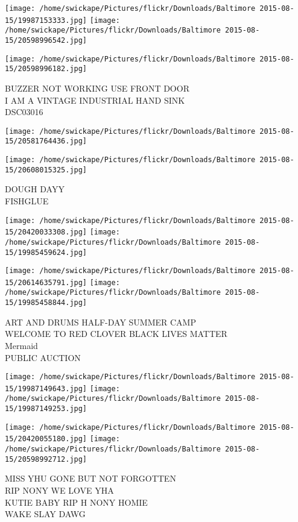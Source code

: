 \documentclass[10pt,letterpaper]{article}
\begin{document}
\texttt{[image: /home/swickape/Pictures/flickr/Downloads/Baltimore 2015-08-15/19987153333.jpg]}
\texttt{[image: /home/swickape/Pictures/flickr/Downloads/Baltimore 2015-08-15/20598996542.jpg]}

\texttt{[image: /home/swickape/Pictures/flickr/Downloads/Baltimore 2015-08-15/20598996182.jpg]}

BUZZER NOT WORKING USE FRONT DOOR\\
I AM A VINTAGE INDUSTRIAL HAND SINK\\
DSC03016\\
\pagebreak

\texttt{[image: /home/swickape/Pictures/flickr/Downloads/Baltimore 2015-08-15/20581764436.jpg]}

\vspace{0.25in}
\texttt{[image: /home/swickape/Pictures/flickr/Downloads/Baltimore 2015-08-15/20608015325.jpg]}

DOUGH DAYY\\
FISHGLUE\\
\pagebreak

\texttt{[image: /home/swickape/Pictures/flickr/Downloads/Baltimore 2015-08-15/20420033308.jpg]}
\texttt{[image: /home/swickape/Pictures/flickr/Downloads/Baltimore 2015-08-15/19985459624.jpg]}

\texttt{[image: /home/swickape/Pictures/flickr/Downloads/Baltimore 2015-08-15/20614635791.jpg]}
\texttt{[image: /home/swickape/Pictures/flickr/Downloads/Baltimore 2015-08-15/19985458844.jpg]}

ART AND DRUMS HALF{-}DAY SUMMER CAMP\\
WELCOME TO RED CLOVER BLACK LIVES MATTER\\
Mermaid\\
PUBLIC AUCTION\\
\pagebreak

\texttt{[image: /home/swickape/Pictures/flickr/Downloads/Baltimore 2015-08-15/19987149643.jpg]}
\texttt{[image: /home/swickape/Pictures/flickr/Downloads/Baltimore 2015-08-15/19987149253.jpg]}

\texttt{[image: /home/swickape/Pictures/flickr/Downloads/Baltimore 2015-08-15/20420055180.jpg]}
\texttt{[image: /home/swickape/Pictures/flickr/Downloads/Baltimore 2015-08-15/20598992712.jpg]}

MISS YHU GONE BUT NOT FORGOTTEN\\
RIP NONY WE LOVE YHA\\
KUTIE BABY RIP H NONY HOMIE\\
WAKE SLAY DAWG\\
\pagebreak
\end{document}
